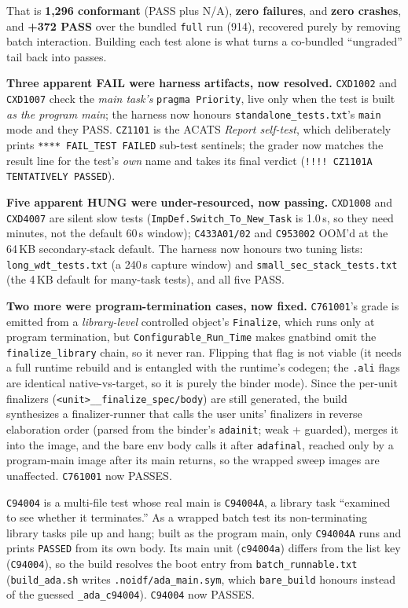 That is \textbf{1{,}296 conformant} (PASS plus N/A), \textbf{zero failures}, and
\textbf{zero crashes}, and \textbf{+372 PASS} over the bundled \texttt{full} run
(914), recovered purely by removing batch interaction. Building each test alone is what
turns a co-bundled ``ungraded'' tail back into passes.

\textbf{Three apparent FAIL were harness artifacts, now resolved.} \texttt{CXD1002} and
\texttt{CXD1007} check the \emph{main task's} \texttt{pragma Priority}, live only when the
test is built \emph{as the program main}; the harness now honours
\texttt{standalone\_tests.txt}'s \texttt{main} mode and they PASS. \texttt{CZ1101} is the
ACATS \emph{Report self-test}, which deliberately prints \texttt{**** FAIL\_TEST FAILED}
sub-test sentinels; the grader now matches the result line for the test's \emph{own} name
and takes its final verdict (\texttt{!!!! CZ1101A TENTATIVELY PASSED}).

\textbf{Five apparent HUNG were under-resourced, now passing.} \texttt{CXD1008} and
\texttt{CXD4007} are silent slow tests (\texttt{ImpDef.Switch\_To\_New\_Task} is 1.0\,s, so
they need minutes, not the default 60\,s window); \texttt{C433A01/02} and \texttt{C953002}
OOM'd at the 64\,KB secondary-stack default. The harness now honours two tuning lists:
\texttt{long\_wdt\_tests.txt} (a 240\,s capture window) and \texttt{small\_sec\_stack\_tests.txt}
(the 4\,KB default for many-task tests), and all five PASS.

\textbf{Two more were program-termination cases, now fixed.}
\texttt{C761001}'s grade is emitted from a \emph{library-level} controlled object's
\texttt{Finalize}, which runs only at program termination, but
\texttt{Configurable\_Run\_Time} makes gnatbind omit the \texttt{finalize\_library} chain,
so it never ran. Flipping that flag is not viable (it needs a full runtime rebuild and is
entangled with the runtime's codegen; the \texttt{.ali} flags are identical native-vs-target,
so it is purely the binder mode). Since the per-unit finalizers
(\texttt{<unit>\_\_finalize\_spec/body}) are still generated, the build synthesizes a
finalizer-runner that calls the user units' finalizers in reverse elaboration order (parsed
from the binder's \texttt{adainit}; weak + guarded), merges it into the image, and the bare
env body calls it after \texttt{adafinal}, reached only by a program-main image after its
main returns, so the wrapped sweep images are unaffected. \texttt{C761001} now PASSES.

\texttt{C94004} is a multi-file test whose real main is \texttt{C94004A}, a library task
``examined to see whether it terminates.'' As a wrapped batch test its non-terminating
library tasks pile up and hang; built as the program main, only \texttt{C94004A} runs and
prints \texttt{PASSED} from its own body. Its main unit (\texttt{c94004a}) differs from the
list key (\texttt{C94004}), so the build resolves the boot entry from
\texttt{batch\_runnable.txt} (\texttt{build\_ada.sh} writes \texttt{.noidf/ada\_main.sym},
which \texttt{bare\_build} honours instead of the guessed \texttt{\_ada\_c94004}).
\texttt{C94004} now PASSES.

